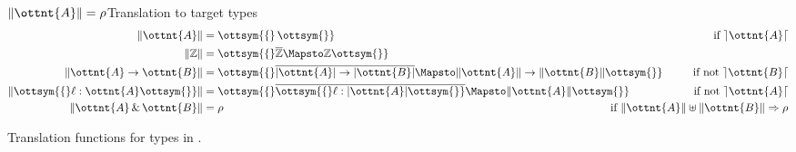 \begin{figure}[b!]
\begin{minipage}{0.5\textwidth}
  \begin{rulesection}{$\|  \ottnt{A}  \| = \rho$}{Translation to target types}
  \begin{align*}
    \|  \ottnt{A}  \| &= \ottsym{\{}  \,  \ottsym{\}} &\text{if $ \rceil \ottnt{A} \lceil $} \\ %
    \|   \mathbb{Z}   \| &= \ottsym{\{}   \overline{\mathbb{Z} }   \Mapsto   \mathbb{Z}   \ottsym{\}} &\\
    \|  \ottnt{A}  \rightarrow  \ottnt{B}  \| &= \ottsym{\{}   \overline{  | \ottnt{A} |  \rightarrow  | \ottnt{B} |  }   \Mapsto  \|  \ottnt{A}  \|  \rightarrow  \|  \ottnt{B}  \|  \ottsym{\}} &\text{if not $ \rceil \ottnt{B} \lceil $}\\%
    \|  \ottsym{\{}  \ell  :  \ottnt{A}  \ottsym{\}}  \| &= \ottsym{\{}   \overline{  \ottsym{\{}   \ell   :    | \ottnt{A} |    \ottsym{\}}  }   \Mapsto  \|  \ottnt{A}  \|  \ottsym{\}} &\text{if not $ \rceil \ottnt{A} \lceil $}\\ %
    \|  \ottnt{A}  \, {\&} \,  \ottnt{B}  \| &= \rho  & \hspace*{-2cm} \text{if $ \|  \ottnt{A}  \| \uplus \|  \ottnt{B}  \| \Rightarrow \rho $} %
  \end{align*}
  \end{rulesection}
  \end{minipage}
  \caption{Translation functions for types in \lambdaiplus.}\label{fig:translation}
\end{figure}

